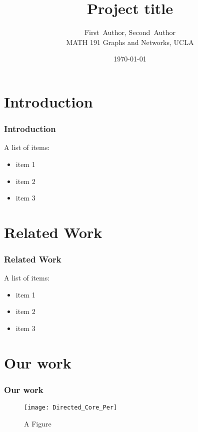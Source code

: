 \documentclass{beamer}
\title{Project title}
\author{ First~Author, Second~Author\\
\vspace{5mm}
MATH 191 Graphs and Networks, UCLA}
\date{ \today}
\begin{document}
\newtheorem{theo}{Theorem}
\newtheorem{lem}{Lemma}
\newtheorem{defin}{Definition}
\newtheorem{prop}{Proposition}
\newtheorem{ex}{Example}
\newtheorem{alg}{Algorithm}
\newtheorem{cor}{Corollary}
\newtheorem{case}{Case}


\begin{frame}
  \titlepage
\end{frame}



\section{Introduction}

\begin{frame}
     \frametitle{Introduction}
A list of items:
\begin{itemize}
\item item 1
\item  item 2
\item  item 3
\end{itemize}
\end{frame}



\section{Related Work}

\begin{frame}
     \frametitle{Related Work}
A list of items:
\begin{itemize}
\item item 1
\item  item 2
\item  item 3
\end{itemize}
\end{frame}




 


\section{Our work}    \label{sec:ourWork}

\begin{frame}
     \frametitle{ Our work}
\begin{figure}[h]
\begin{center}
\texttt{[image: Directed\_Core\_Per]}
\end{center}
\caption{A Figure}
\label{fig:DirCorPer}
\end{figure}

\end{frame}
\end{document}
